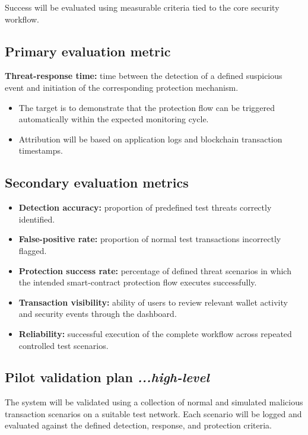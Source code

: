 \documentclass[10pt,a4paper]{article}
\begin{document}
Success will be evaluated using measurable criteria tied to the core security workflow.

\subsection{Primary evaluation metric}

\textbf{Threat-response time:} time between the detection of a defined suspicious event and initiation of the corresponding protection mechanism.

\begin{itemize}
    \item The target is to demonstrate that the protection flow can be triggered automatically within the expected monitoring cycle.
    \item Attribution will be based on application logs and blockchain transaction timestamps.
\end{itemize}

\subsection{Secondary evaluation metrics}

\begin{itemize}
    \item \textbf{Detection accuracy:} proportion of predefined test threats correctly identified.
    \item \textbf{False-positive rate:} proportion of normal test transactions incorrectly flagged.
    \item \textbf{Protection success rate:} percentage of defined threat scenarios in which the intended smart-contract protection flow executes successfully.
    \item \textbf{Transaction visibility:} ability of users to review relevant wallet activity and security events through the dashboard.
    \item \textbf{Reliability:} successful execution of the complete workflow across repeated controlled test scenarios.
\end{itemize}

\subsection{Pilot validation plan \hfill \normalfont\itshape ...high-level}

The system will be validated using a collection of normal and simulated malicious transaction scenarios on a suitable test network. Each scenario will be logged and evaluated against the defined detection, response, and protection criteria.
\end{document}
